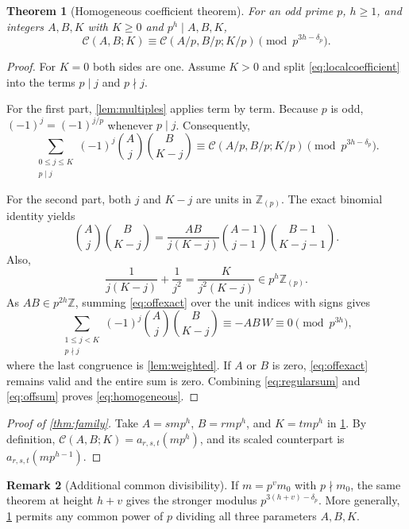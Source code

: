 \documentclass[11pt,a4paper]{article}
\numberwithin{equation}{section}
\theoremstyle{research}
\newtheorem{theorem}{Theorem}[section]
\theoremstyle{definition}
\newtheorem{remark}[theorem]{Remark}
\newcommand{\Z}{\mathbb Z}
\newcommand{\Zloc}{\mathbb Z_{(p)}}
\newcommand{\CC}{\mathcal C}
\begin{document}
\begin{theorem}[Homogeneous coefficient theorem]\label{thm:homogeneous}
For an odd prime $p$, $h\ge1$, and integers $A,B,K$ with $K\ge0$ and
$p^h\mid A,B,K$,
\begin{equation}\label{eq:homogeneous}
 \CC(A,B;K)\equiv\CC(A/p,B/p;K/p)
                         \pmod{p^{3h-\delta_p}}.
\end{equation}
\end{theorem}
\begin{proof}
For $K=0$ both sides are one. Assume $K>0$ and split
\eqref{eq:localcoefficient} into the terms $p\mid j$ and $p\nmid j$.

For the first part, \cref{lem:multiples} applies term by term.
Because $p$ is odd, $(-1)^j=(-1)^{j/p}$ whenever $p\mid j$.
Consequently,
\begin{equation}\label{eq:regularsum}
 \sum_{\substack{0\le j\le K\\p\mid j}}
 (-1)^j\binom Aj\binom B{K-j}
 \equiv\CC(A/p,B/p;K/p)\pmod{p^{3h-\delta_p}}.
\end{equation}

For the second part, both $j$ and $K-j$ are units in $\Zloc$.
The exact binomial identity yields
\begin{equation}\label{eq:offexact}
 \binom Aj\binom B{K-j}
 =\frac{AB}{j(K-j)}\binom{A-1}{j-1}\binom{B-1}{K-j-1}.
\end{equation}
Also,
\[
 \frac1{j(K-j)}+\frac1{j^2}
   =\frac K{j^2(K-j)}\in p^h\Zloc.
\]
As $AB\in p^{2h}\Z$, summing \eqref{eq:offexact} over the unit indices
with signs gives
\begin{equation}\label{eq:offsum}
 \sum_{\substack{1\le j<K\\p\nmid j}}
 (-1)^j\binom Aj\binom B{K-j}
 \equiv -AB\,W\equiv0\pmod{p^{3h}},
\end{equation}
where the last congruence is \cref{lem:weighted}. If $A$ or $B$ is
zero, \eqref{eq:offexact} remains valid and the entire sum is zero.
Combining \eqref{eq:regularsum} and \eqref{eq:offsum} proves
\eqref{eq:homogeneous}.
\end{proof}

\begin{proof}[Proof of \cref{thm:family}]
Take $A=smp^h$, $B=rmp^h$, and $K=tmp^h$ in
\cref{thm:homogeneous}. By definition,
$\CC(A,B;K)=a_{r,s,t}(mp^h)$, and its scaled counterpart is
$a_{r,s,t}(mp^{h-1})$.
\end{proof}

\begin{remark}[Additional common divisibility]
If $m=p^v m_0$ with $p\nmid m_0$, the same theorem at height $h+v$
gives the stronger modulus $p^{3(h+v)-\delta_p}$. More generally,
\cref{thm:homogeneous} permits any common power of $p$ dividing all
three parameters $A,B,K$.
\end{remark}
\end{document}
